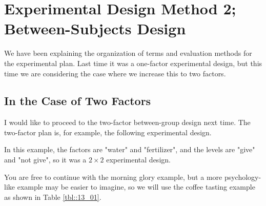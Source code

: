 \documentclass{ltjbook}
\begin{document}
\chapter{Experimental Design Method 2; Between-Subjects Design}
\label{m13_design2}

We have been explaining the organization of terms and evaluation methods for the experimental plan. Last time it was a one-factor experimental design, but this time we are considering the case where we increase this to two factors.

\section{In the Case of Two Factors}
\label{Between2way}
I would like to proceed to the two-factor between-group design next time.
The two-factor plan is, for example, the following experimental design.



In this example, the factors are "water" and "fertilizer", and the levels are "give" and "not give", so it was a $2\times2$ experimental design.

You are free to continue with the morning glory example, but a more psychology-like example may be easier to imagine, so we will use the coffee tasting example as shown in Table \ref {tbl::13_01}.


\end{document}
